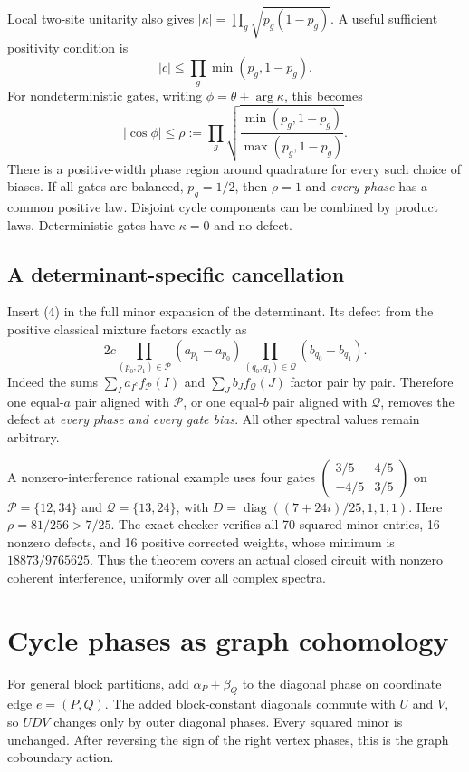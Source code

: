 \documentclass[11pt]{article}
\newcommand{\diag}{\operatorname{diag}}\newcommand{\Rea}{\operatorname{Re}}
\begin{document}
Local two-site unitarity also gives
$|\kappa|=\prod_g\sqrt{p_g(1-p_g)}$. A useful sufficient positivity condition is
\[
|c|\le\prod_g\min(p_g,1-p_g).
\tag{6}
\]
For nondeterministic gates, writing $\phi=\theta+\arg\kappa$, this becomes
\[
|\cos\phi|\le
\rho:=\prod_g\sqrt{\frac{\min(p_g,1-p_g)}{\max(p_g,1-p_g)}}.
\tag{7}
\]
There is a positive-width phase region around quadrature for every such choice of biases. If all gates are balanced, $p_g=1/2$, then $\rho=1$ and \emph{every phase} has a common positive law. Disjoint cycle components can be combined by product laws. Deterministic gates have $\kappa=0$ and no defect.


\subsection{A determinant-specific cancellation}
Insert (4) in the full minor expansion of the determinant. Its defect from the positive classical mixture factors exactly as
\[
2c\prod_{(p_0,p_1)\in\mathcal P}(a_{p_1}-a_{p_0})
   \prod_{(q_0,q_1)\in\mathcal Q}(b_{q_0}-b_{q_1}).
\tag{8}
\]
Indeed the sums $\sum_I a_{I^c}f_{\mathcal P}(I)$ and
$\sum_J b_Jf_{\mathcal Q}(J)$ factor pair by pair. Therefore one equal-$a$ pair aligned with $\mathcal P$, or one equal-$b$ pair aligned with $\mathcal Q$, removes the defect at \emph{every phase and every gate bias}. All other spectral values remain arbitrary.

A nonzero-interference rational example uses four gates
$\left(\begin{smallmatrix}3/5&4/5\\-4/5&3/5\end{smallmatrix}\right)$ on
$\mathcal P=\{12,34\}$ and $\mathcal Q=\{13,24\}$, with
$D=\diag((7+24i)/25,1,1,1)$. Here $\rho=81/256>7/25$.
The exact checker verifies all 70 squared-minor entries, 16 nonzero defects, and 16 positive corrected weights, whose minimum is $18873/9765625$. Thus the theorem covers an actual closed circuit with nonzero coherent interference, uniformly over all complex spectra.



\section{Cycle phases as graph cohomology}
For general block partitions, add $\alpha_P+\beta_Q$ to the diagonal phase on coordinate edge $e=(P,Q)$. The added block-constant diagonals commute with $U$ and $V$, so $UDV$ changes only by outer diagonal phases. Every squared minor is unchanged. After reversing the sign of the right vertex phases, this is the graph coboundary action.
\end{document}

